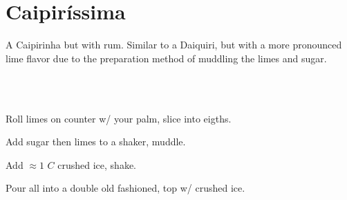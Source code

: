 \section[Caipir\'issima]{Caipir\'issima~}


\begin{recipestats}[
	servings=1,
	preptime=5 \minute,
	source=Mike \& Jane,
	original=\citeauthor{diffordsCaipirissima}~\cite{diffordsCaipirissima},
]
\end{recipestats}

\begin{recipeabstract}
	A Caipirinha but with rum.
	Similar to a Daiquiri, but with a more pronounced lime flavor due to the preparation method of muddling the limes and sugar.
\end{recipeabstract}


\begin{ingredientcolumns}[1]
	\begin{ingredientblock}
		\\
		\\
	\end{ingredientblock}
\end{ingredientcolumns}


\begin{preparation}
\item Roll limes on counter w/ your palm, slice into eigths.
\item Add sugar then limes to a shaker, muddle.
\item Add $\approx 1$ $C$ crushed ice, shake.
\item Pour all into a double old fashioned, top w/ crushed ice.
\end{preparation}


\recipeend%
